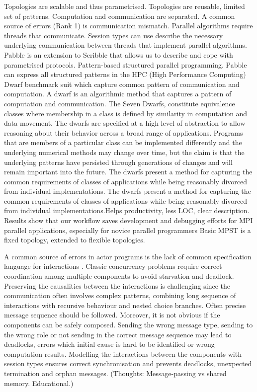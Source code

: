 Topologies are scalable and thus parametrised. Topologies are reusable, limited set of patterns. 
Computation and communication are separated. A common source of errors (Rank 1) is communication mismatch.  
 Parallel algorithms require threads that communicate. Session types can use describe the necessary underlying communication between threads that implement parallel algorithms.	 Pabble is an extension to Scribble that allows us to describe and cope with parametrised protocols. Pattern-based structured parallel programming. Pabble can express all structured patterns in the HPC (High Performance Computing) Dwarf benchmark suit which capture common pattern of communication and computation.  A dwarf is an algorithmic method that captures a pattern of computation and communication. The Seven Dwarfs, constitute equivalence classes where membership in a class is defined by similarity in computation and data movement. The dwarfs are specified at a high level of abstraction to allow reasoning about their behavior across a broad range of applications. Programs that are members of a particular class can be implemented differently and the underlying numerical methods may change over time, but the claim is that the underlying patterns have persisted through generations of changes and will remain important into the future. The dwarfs present a method for capturing the common requirements of classes of
applications while being reasonably divorced from individual implementations. The dwarfs present a method for capturing the common requirements of classes of applications while being reasonably divorced from individual implementations.Helps productivity, less LOC, clear description. Results show that our workflow saves development and debugging efforts for MPI parallel applications, especially for novice parallel programmers 
Basic MPST is a fixed topology, extended to flexible topologies.  

A common source of errors in actor programs is the lack of common specification language for interactions \cite{}. 
Classic concurrency problems require correct coordination among multiple components to avoid starvation and deadlock. Preserving the causalities between the interactions is challenging since the communication often involves complex patterns, combining long sequence of interactions with recursive behaviour and nested choice branches.
Often precise message sequence should be followed. Moreover, it is not obvious if the components can be safely composed. Sending the wrong message type, sending to the wrong role or not sending in the correct message sequence may lead to deadlocks, errors which initial cause is hard to be identified or wrong computation results.
Modelling the interactions between the components with session types ensures correct synchronisation and prevents deadlocks, unexpected termination and orphan messages. 
(Thoughts: Message-passing vs shared memory. Educational.)


